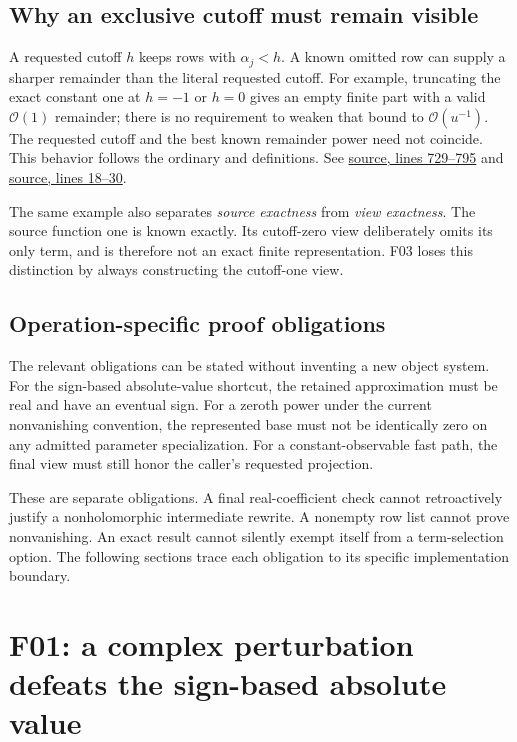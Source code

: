 \documentclass[11pt,letterpaper]{article}
\newcommand{\src}[3]{\href{https://github.com/VladimirReshetnikov/Asymptotic/blob/8e859961d7d37f008b826f3a8cad406460271614/#1\#L#2-L#3}{source, lines #2--#3}}
\newcommand{\code}[1]{\texttt{\detokenize{#1}}}
\newcommand{\Oterm}{\mathcal{O}}
\begin{document}
\subsection{Why an exclusive cutoff must remain visible}

A requested cutoff $h$ keeps rows with $\alpha_j<h$. A known omitted row can supply a sharper remainder than the literal requested cutoff. For example, truncating the exact constant one at $h=-1$ or $h=0$ gives an empty finite part with a valid $\Oterm(1)$ remainder; there is no requirement to weaken that bound to $\Oterm(u^{-1})$. The requested cutoff and the best known remainder power need not coincide. This behavior follows the ordinary \code{makeForwardObject} and \code{seriesTrim} definitions.\cite{core,operations} See \src{src/Kernel/AsymptoticAnalysis.wl}{729}{795} and \src{src/Kernel/SeriesOperations.wl}{18}{30}.

The same example also separates \emph{source exactness} from \emph{view exactness}. The source function one is known exactly. Its cutoff-zero view deliberately omits its only term, and is therefore not an exact finite representation. F03 loses this distinction by always constructing the cutoff-one view.

\subsection{Operation-specific proof obligations}

The relevant obligations can be stated without inventing a new object system. For the sign-based absolute-value shortcut, the retained approximation must be real and have an eventual sign. For a zeroth power under the current nonvanishing convention, the represented base must not be identically zero on any admitted parameter specialization. For a constant-observable fast path, the final view must still honor the caller's requested projection.

These are separate obligations. A final real-coefficient check cannot retroactively justify a nonholomorphic intermediate rewrite. A nonempty row list cannot prove nonvanishing. An exact result cannot silently exempt itself from a term-selection option. The following sections trace each obligation to its specific implementation boundary.

\section{F01: a complex perturbation defeats the sign-based absolute value}\label{sec:F01}
\end{document}
